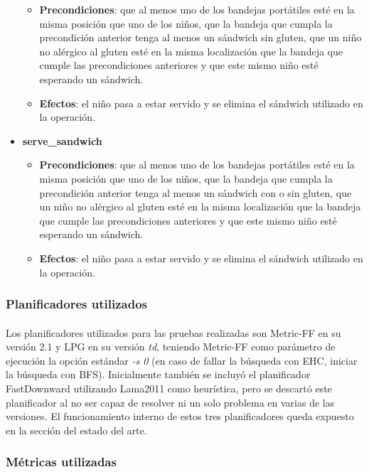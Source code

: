 \documentclass{article}
\begin{document}
\begin{itemize}
\begin{itemize}
            \item \textbf{Precondiciones}: que al menos uno de los bandejas portátiles esté en la misma posición que uno de los niños, que la bandeja que cumpla la precondición anterior tenga al menos un sándwich sin gluten, que un niño no alérgico al gluten esté en la misma localización que la bandeja que cumple las precondiciones anteriores y que este mismo niño esté esperando un sándwich.
            \item \textbf{Efectos}: el niño pasa a estar servido y se elimina el sándwich utilizado en la operación.
        \end{itemize}
    \item \textbf{serve\_sandwich}
        \begin{itemize}
            \item \textbf{Precondiciones}: que al menos uno de los bandejas portátiles esté en la misma posición que uno de los niños, que la bandeja que cumpla la precondición anterior tenga al menos un sándwich con o sin gluten, que un niño no alérgico al gluten esté en la misma localización que la bandeja que cumple las precondiciones anteriores y que este mismo niño esté esperando un sándwich.
            \item \textbf{Efectos}: el niño pasa a estar servido y se elimina el sándwich utilizado en la operación.
        \end{itemize}
\end{itemize}

\subsubsection{Planificadores utilizados}
\paragraph{}
Los planificadores utilizados para las pruebas realizadas son Metric-FF en su versión 2.1 y LPG en su versión \textit{td}, teniendo Metric-FF como parámetro de ejecución la opción estándar \textit{-s 0} (en caso de fallar la búsqueda con EHC, iniciar la búsqueda con BFS). Inicialmente también se incluyó el planificador FastDownward utilizando Lama2011 como heurística, pero se descartó este planificador al no ser capaz de resolver ni un solo problema en varias de las versiones. El funcionamiento interno de estos tres planificadores queda expuesto en la sección del estado del arte.

\subsubsection{Métricas utilizadas}
\end{document}
